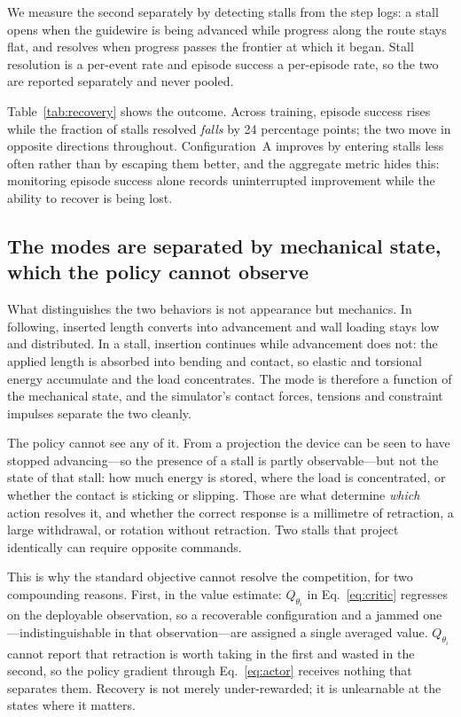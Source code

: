 We measure the second separately by detecting stalls from the step logs: a stall opens when the
guidewire is being advanced while progress along the route stays flat, and resolves when progress
passes the frontier at which it began. Stall resolution is a per-event rate and episode success a
per-episode rate, so the two are reported separately and never pooled.

Table~\ref{tab:recovery} shows the outcome. Across training, episode success rises while the
fraction of stalls resolved \emph{falls} by 24 percentage points; the two move in opposite
directions throughout. Configuration~A improves by entering stalls less often rather than by
escaping them better, and the aggregate metric hides this: monitoring episode success alone
records uninterrupted improvement while the ability to recover is being lost.

\subsection{The modes are separated by mechanical state, which the policy cannot observe}
\label{sec:why}

What distinguishes the two behaviors is not appearance but mechanics. In following, inserted
length converts into advancement and wall loading stays low and distributed. In a stall, insertion
continues while advancement does not: the applied length is absorbed into bending and contact, so
elastic and torsional energy accumulate and the load concentrates. The mode is therefore a
function of the mechanical state, and the simulator's contact forces, tensions and constraint
impulses separate the two cleanly.

The policy cannot see any of it. From a projection the device can be seen to have stopped
advancing---so the presence of a stall is partly observable---but not the state of that stall: how
much energy is stored, where the load is concentrated, or whether the contact is sticking or
slipping. Those are what determine \emph{which} action resolves it, and whether the correct
response is a millimetre of retraction, a large withdrawal, or rotation without retraction. Two
stalls that project identically can require opposite commands.

This is why the standard objective cannot resolve the competition, for two compounding reasons.
First, in the value estimate: $Q_{\theta_i}$ in Eq.~\eqref{eq:critic} regresses on the deployable
observation, so a recoverable configuration and a jammed one---indistinguishable in that
observation---are assigned a single averaged value. $Q_{\theta_i}$ cannot report that retraction is
worth taking in the first and wasted in the second, so the policy gradient through
Eq.~\eqref{eq:actor} receives nothing that separates them. Recovery is not merely under-rewarded;
it is unlearnable at the states where it matters.


